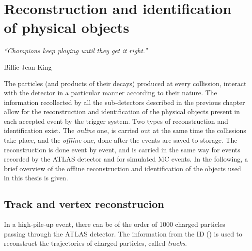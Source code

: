 \chapter{Reconstruction and identification of physical objects}
\label{ch:objects}
\epigraph{\emph{“Champions keep playing until they get it right.”}}{Billie Jean King}


The particles (and products of their decays) produced at every collission, interact with the detector in a particular manner according to their nature. The information recollected by all the sub-detectors described in the previous chapter allow for the reconstruction and identification of the physical objects present in each accepted event by the trigger system. Two types of reconstruction and identification exist. The \textit{online} one, is carried out at the same time the \pp collissions take place, and the \textit{offline} one, done after the events are saved to storage. The reconstruction is done event by event, and is carried in the same way for events recorded by the \ac{ATLAS} detector and for simulated \ac{MC} events. In the following, a brief overview of the offline reconstruction and identification of the objects used in this thesis is given.






\section{Track and vertex reconstrucion}

In a high-pile-up event, there can be of the order of 1000 charged particles passing through the \ac{ATLAS} detector. The information from the \ac{ID} (\Sect{\ref{subsec:atlas:atlas:id}}) is used to reconstruct the trajectories of charged particles, called \textit{tracks}.

